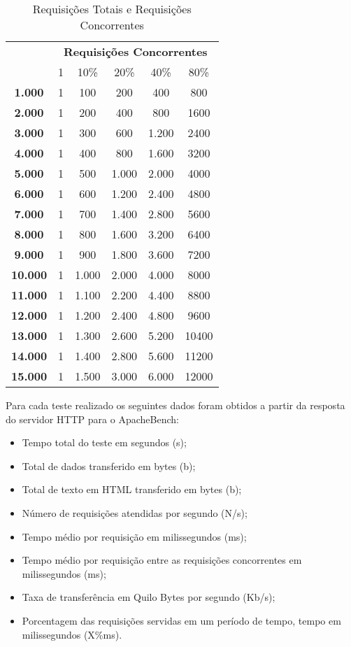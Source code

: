 \begin{table}[htb]
	\centering
\ABNTEXfontereduzida
\caption[Requisições Totais e Requisições Concorrentes]{Requisições Totais e Requisições Concorrentes}
\label{tab:requisicoes}
\begin{tabular}{|>{\bfseries}c|c|c|c|c|c|}
\hline
\multirow{2}{*}{Requisições Totais} & \multicolumn{5}{c|}{\textbf{Requisições Concorrentes}} \\ \cline{2-6}
& 1    & 10\%      & 20\%  & 40\%  & 80\%  \\ \hline
1.000  & 1 & 100   & 200   & 400   & 800   \\ \hline
2.000  & 1 & 200   & 400   & 800   & 1600  \\ \hline
3.000  & 1 & 300   & 600   & 1.200 & 2400  \\ \hline
4.000  & 1 & 400   & 800   & 1.600 & 3200  \\ \hline
5.000  & 1 & 500   & 1.000 & 2.000 & 4000  \\ \hline
6.000  & 1 & 600   & 1.200 & 2.400 & 4800  \\ \hline
7.000  & 1 & 700   & 1.400 & 2.800 & 5600  \\ \hline
8.000  & 1 & 800   & 1.600 & 3.200 & 6400  \\ \hline
9.000  & 1 & 900   & 1.800 & 3.600 & 7200  \\ \hline
10.000 & 1 & 1.000 & 2.000 & 4.000 & 8000  \\ \hline
11.000 & 1 & 1.100 & 2.200 & 4.400 & 8800  \\ \hline
12.000 & 1 & 1.200 & 2.400 & 4.800 & 9600  \\ \hline
13.000 & 1 & 1.300 & 2.600 & 5.200 & 10400 \\ \hline
14.000 & 1 & 1.400 & 2.800 & 5.600 & 11200 \\ \hline
15.000 & 1 & 1.500 & 3.000 & 6.000 & 12000 \\ \hline

\end{tabular}
\end{table}
 
Para cada teste realizado os seguintes dados foram obtidos a partir da resposta do servidor HTTP para o ApacheBench:

\begin{itemize}
	\item Tempo total do teste em segundos (s);
	\item Total de dados transferido em bytes (b);
	\item Total de texto em HTML transferido em bytes (b);
	\item Número de requisições atendidas por segundo (N/s);
	\item Tempo médio por requisição em milissegundos (ms);
	\item Tempo médio por requisição entre as requisições concorrentes em milissegundos (ms);
	\item Taxa de transferência em Quilo Bytes por segundo (Kb/s);
	\item Porcentagem das requisições servidas em um período de tempo, tempo em milissegundos (X\%ms).
\end{itemize}
